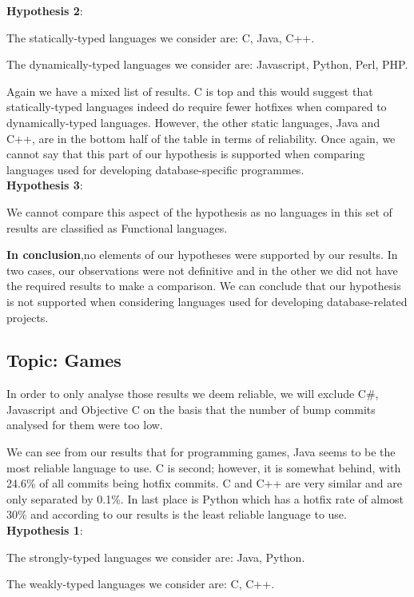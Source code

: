 \textbf{Hypothesis 2}:\par
The statically-typed languages we consider are: C, Java, C++.\par
The dynamically-typed languages we consider are: Javascript, Python, Perl, PHP.\par

Again we have a mixed list of results. C is top and this would suggest that statically-typed languages indeed do require fewer hotfixes when compared to dynamically-typed languages. However, the other static languages, Java and C++, are in the bottom half of the table in terms of reliability. Once again, we cannot say that this part of our hypothesis is supported when comparing languages used for developing database-specific programmes.\\

\textbf{Hypothesis 3}:\par
We cannot compare this aspect of the hypothesis as no languages in this set of results are classified as Functional languages.\par
\textbf{In conclusion},no elements of our hypotheses were supported by our results. In two cases, our observations were not definitive and in the other we did not have the required results to make a comparison. We can conclude that our hypothesis is not supported when considering languages used for developing  database-related projects.

\subsection{Topic: Games}
In order to only analyse those results we deem reliable, we will exclude C\#, Javascript and Objective C on the basis that the number of bump commits analysed for them were too low.\par

We can see from our results that for programming games, Java seems to be the most reliable language to use. C is second; however, it is somewhat behind, with 24.6\% of all commits being hotfix commits. C and C++ are very similar and are only separated by 0.1\%. In last place is Python which has a hotfix rate of almost 30\% and according to our results is the least reliable language to use.\\

\textbf{Hypothesis 1}:\par
The strongly-typed languages we consider are: Java, Python.\par
The weakly-typed languages we consider are: C, C++.\par

